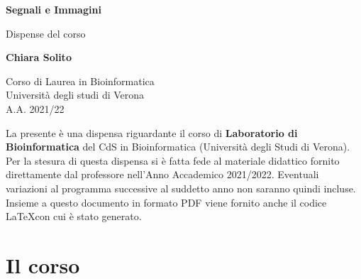 \documentclass{article}
\begin{document}
\newcommand\tab[1][0.3cm]{\hspace*{#1}}


\begin{titlepage}
    \begin{center}
        \vspace*{1cm}
            
        \Huge
        \textbf{Segnali e Immagini}
            
        \vspace{0.5cm}
        \LARGE
        Dispense del corso
            
        \vspace{1.5cm}
            
        \textbf{Chiara Solito}

        \vspace{0.8cm}

            
        \Large
        Corso di Laurea in Bioinformatica\\
        Università degli studi di Verona\\
        A.A. 2021/22
            
    \end{center}
\end{titlepage}
La presente è una dispensa riguardante il corso di \textbf{Laboratorio di Bioinformatica} del CdS in Bioinformatica (Università degli Studi di Verona). Per la stesura di questa dispensa si è fatta fede al materiale didattico fornito direttamente dal professore nell'Anno Accademico 2021/2022. Eventuali variazioni al programma successive al suddetto anno non saranno quindi incluse.\\
Insieme a questo documento in formato PDF viene fornito anche il codice \LaTeX  con cui è stato generato.
\tableofcontents
\thispagestyle{empty}
\newpage
\thispagestyle{empty}
\section{Il corso}
\end{document}
